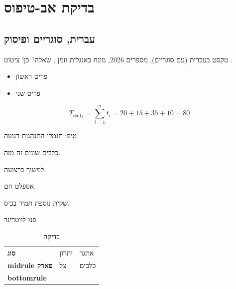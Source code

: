 \documentclass[11pt,openany]{report}
\begin{document}
\tableofcontents
\chapter{בדיקת אב-טיפוס}
\section{עברית, סוגריים ופיסוק}
טקסט בעברית (עם סוגריים), מספרים 2026, מונח באנגלית  וזמן . שאלה? כן! ציטוט \cite{avma-warm}.
\begin{itemize}\item פריט ראשון \item פריט שני\end{itemize}
\[ T_{\text{daily}} = \sum_{i=1}^{n} t_i = 20+15+35+10 = 80 \]
\begin{tipbox}טיפ: תגמלו התנהגות רגועה.\end{tipbox}
\begin{knowbox}כלבים שונים זה מזה.\end{knowbox}
\begin{mistakebox}למשוך ברצועה.\end{mistakebox}
\begin{notebox}אספלט חם.\end{notebox}
\begin{fieldbox}שקית נוספת תמיד בכיס.\end{fieldbox}
\begin{emergencybox}פנו לווטרינר.\end{emergencybox}
\begin{table}[h]\centering\caption{בדיקה}
\begin{tabularx}{\linewidth}{>{\bfseries}lXX}\toprule סוג & יתרון & אתגר\\midrule פארק & צל & כלבים\\bottomrule\end{tabularx}\end{table}
\begin{center}\end{center}
\printbibliography[title={מקורות}]
\end{document}
